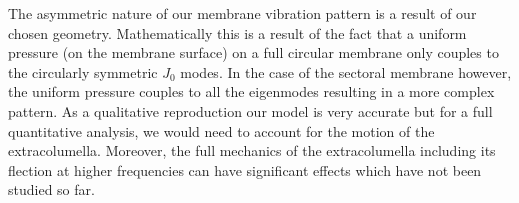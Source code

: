 The asymmetric nature of our membrane vibration pattern is a result of our chosen geometry.
Mathematically this is a result of the fact that a uniform pressure (on the membrane surface) on a full circular membrane only couples to the circularly symmetric $J_0$ modes.
In the case of the sectoral membrane however, the uniform pressure couples to all the eigenmodes resulting in a more complex pattern.
As a qualitative reproduction our model is very accurate but for a full quantitative analysis, we would 
need to account for the motion of the extracolumella. Moreover, the full mechanics of the extracolumella including 
 its flection at higher frequencies can have significant effects which have not been studied so far.

